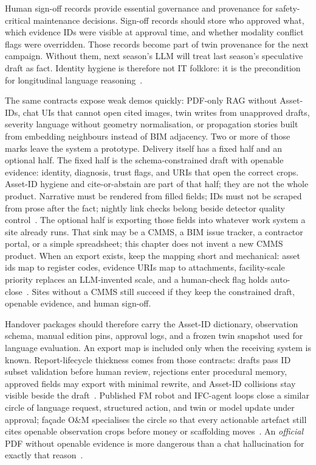 Human sign-off records provide essential governance and provenance for safety-critical maintenance decisions. Sign-off records should store who approved what, which evidence IDs were visible at approval time, and whether modality conflict flags were overridden. Those records become part of twin provenance for the next campaign. Without them, next season's LLM will treat last season's speculative draft as fact. Identity hygiene is therefore not IT folklore: it is the precondition for longitudinal language reasoning~\cite{zhang2025}.

The same contracts expose weak demos quickly: PDF-only RAG without Asset-IDs, chat UIs that cannot open cited images, twin writes from unapproved drafts, severity language without geometry normalisation, or propagation stories built from embedding neighbours instead of BIM adjacency. Two or more of those marks leave the system a prototype. Delivery itself has a fixed half and an optional half. The fixed half is the schema-constrained draft with openable evidence: identity, diagnosis, trust flags, and URIs that open the correct crops. Asset-ID hygiene and cite-or-abstain are part of that half; they are not the whole product. Narrative must be rendered from filled fields; IDs must not be scraped from prose after the fact; nightly link checks belong beside detector quality control~\cite{zheng2023bimassistant,joffe2025buildingcodes,zhang2025,gao2026ifcagent}. The optional half is exporting those fields into whatever work system a site already runs. That sink may be a CMMS, a BIM issue tracker, a contractor portal, or a simple spreadsheet; this chapter does not invent a new CMMS product. When an export exists, keep the mapping short and mechanical: asset ids map to register codes, evidence URIs map to attachments, facility-scale priority replaces an LLM-invented scale, and a human-check flag holds auto-close~\cite{chen2023facility,krutli2025fmrags,buga2025llmfmsql}. Sites without a CMMS still succeed if they keep the constrained draft, openable evidence, and human sign-off.

Handover packages should therefore carry the Asset-ID dictionary, observation schema, manual edition pins, approval logs, and a frozen twin snapshot used for language evaluation. An export map is included only when the receiving system is known. Report-lifecycle thickness comes from those contracts: drafts pass ID subset validation before human review, rejections enter procedural memory, approved fields may export with minimal rewrite, and Asset-ID collisions stay visible beside the draft~\cite{buga2025llmfmsql,chen2023facility,quan2026bimfacrag,hellin2025bimmas}. Published FM robot and IFC-agent loops close a similar circle of language request, structured action, and twin or model update under approval; fa\c{c}ade O\&M specialises the circle so that every actionable artefact still cites openable observation crops before money or scaffolding moves~\cite{luo2025llmdtrobot,gao2026ifcagent,saka2024gptconstruction}. An \emph{official} PDF without openable evidence is more dangerous than a chat hallucination for exactly that reason~\cite{ji2023}.

